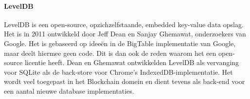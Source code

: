 \paragraph{LevelDB}\label{para:LevelDB}
LevelDB is een open-source, opzichzelfstaande, embedded key-value data opslag. Het is in 2011 ontwikkeld door Jeff Dean en Sanjay Ghemawat, onderzoekers van Google. Het is gebaseerd op ideeën in de BigTable implementatie van Google, maar deelt hiermee geen code. Dit is dan ook de reden waarom het een open-source licentie heeft. Dean en Ghemawat ontwikkelden LevelDB als vervanging voor SQLite als de back-store voor Chrome's IndexedDB-implementatie. Het wordt veel toegepast in het Blockchain domein en dient tevens als back-end voor een aantal nieuwe database implementaties.


